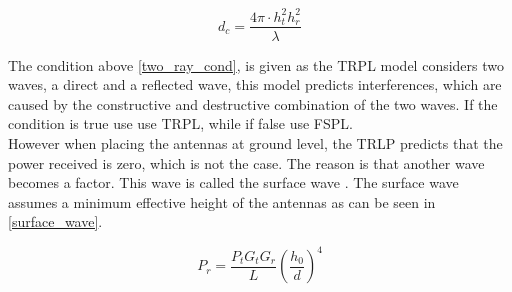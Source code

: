 \begin{equation}
d_{c} = \frac{4\pi \cdot h^2_t h^2_r }{\lambda}
\label{two_ray_cross_dis}
\end{equation}  

The condition above \eqref{two_ray_cond}, is given as the TRPL model considers two waves, a direct and a reflected wave, this model predicts interferences, which are caused by the constructive and destructive combination of the two waves. If the condition is true use  use TRPL, while if false use FSPL.   %
\\










However when placing the antennas at ground level, the TRLP predicts that the power received is zero, which is not the case.
The reason is that another wave becomes a factor. This wave is called the surface wave \cite{Chong}. The surface wave assumes a minimum effective height of the antennas as can be seen in \eqref{surface_wave}. 

\begin{equation}
P_r=\frac{P_t G_t G_r }{L}\left(\frac{h_0}{d}\right)^4
\label{surface_wave}
\end{equation}

